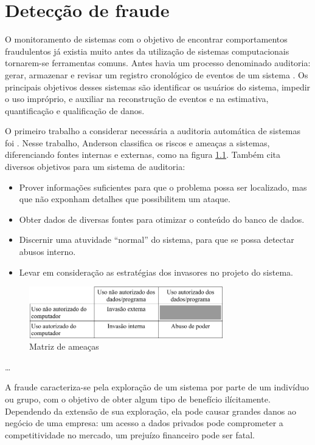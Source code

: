 \chapter{Detecção de fraude}

O monitoramento de sistemas com o objetivo de encontrar comportamentos fraudulentos já existia muito antes da utilização de sistemas computacionais tornarem-se ferramentas comuns. Antes havia um processo denominado auditoria: gerar, armazenar e revisar um registro cronológico de eventos de um sistema \cite[p. 7]{Bace2000}. Os principais objetivos desses sistemas são identificar os usuários do sistema, impedir o uso impróprio, e auxiliar na reconstrução de eventos e na estimativa, quantificação e qualificação de danos.

O primeiro trabalho a considerar necessária a auditoria automática de sistemas foi \citet{Anderson1972}. Nesse trabalho, Anderson classifica os riscos e ameaças a sistemas, diferenciando fontes internas e externas, como na figura \ref{fig:and}. Também cita diversos objetivos para um sistema de auditoria:

\begin{itemize}
\item Prover informações suficientes para que o problema possa ser localizado, mas que não exponham detalhes que possibilitem um ataque.
\item Obter dados de diversas fontes para otimizar o conteúdo do banco de dados.
\item Discernir uma atuvidade ``normal'' do sistema, para que se possa detectar abusos interno.
\item Levar em consideração as estratégias dos invasores no projeto do sistema.
\end{itemize}

\begin{figure}[h]
\centering
\includegraphics[width=0.75\textwidth]{img/anderson.png}
\caption{Matriz de ameaças}
\label{fig:and}
\end{figure}

\ldots

A fraude caracteriza-se pela exploração de um sistema por parte de um indivíduo ou grupo, com o objetivo de obter algum tipo de benefício ilícitamente. Dependendo da extensão de sua exploração, ela pode causar grandes danos ao negócio de uma empresa: um acesso a dados privados pode comprometer a competitividade no mercado, um prejuízo financeiro pode ser fatal.

